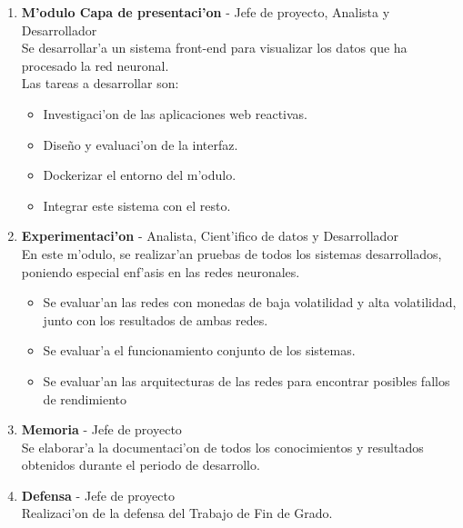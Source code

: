 \begin{enumerate}
\item \textbf{M'odulo Capa de presentaci'on} - Jefe de proyecto, Analista y Desarrollador\\
Se desarrollar'a un sistema front-end para visualizar los datos que ha procesado la red neuronal.\\ Las tareas a desarrollar son:
\begin{itemize}
\item Investigaci'on de las aplicaciones web reactivas.
\item Diseño y evaluaci'on de la interfaz.
\item Dockerizar el entorno del m'odulo.
\item Integrar este sistema con el resto.
\end{itemize}


\item \textbf{Experimentaci'on} - Analista, Cient'ifico de datos y Desarrollador\\
En este m'odulo, se realizar'an pruebas de todos los sistemas desarrollados, poniendo especial enf'asis en las redes neuronales.
\begin{itemize}
\item Se evaluar'an las redes con monedas de baja volatilidad y alta volatilidad, junto con los resultados de ambas redes.
\item Se evaluar'a el funcionamiento conjunto de los sistemas.
\item Se evaluar'an las arquitecturas de las redes para encontrar posibles fallos de rendimiento
\end{itemize}


\item \textbf{Memoria} - Jefe de proyecto\\
Se elaborar'a la documentaci'on de todos los conocimientos y resultados obtenidos durante el periodo de desarrollo.

\item \textbf{Defensa} - Jefe de proyecto\\
Realizaci'on de la defensa del Trabajo de Fin de Grado.
\end{enumerate}

\clearpage